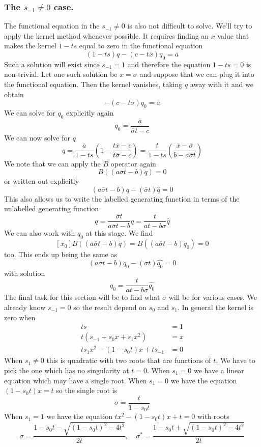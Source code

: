 \documentclass[12pt]{article}
\theoremstyle{definition} \newtheorem{definition}[theorem]{Definition}
\newcommand{\ol}[1]{\overline{#1}}
\newcommand{\wh}{\widehat}
\begin{document}
\subsubsection{The $s_{-1} \neq 0$ case.}
The functional equation in the $s_{-1} \neq 0$ is also not difficult to solve. We'll try to apply the kernel method whenever possible. It requires finding an $x$ value that makes the kernel $1 - ts$ equal to zero in the functional equation
\[
	(1-ts)q - (c -t\ol{x})q_0 = \ol{a}
\]
Such a solution will exist since $s_{-1} = 1$ and therefore the equation $1 - ts = 0$ is non-trivial. Let one such solution be $x = \sigma$ and suppose that we can plug it into the functional equation. Then the kernel vanishes, taking $q$ away with it and we obtain
\[
	- (c - t\ol{\sigma})q_0 = \ol{a}
\]
We can solve for $q_0$ explicitly again
\[
	q_0 = \frac{\ol{a}}{\ol{\sigma}t-c}
\]
We can now solve for $q$
\[
	q = \frac{\ol{a}}{1-ts}\left(1 - \frac{t\ol{x}-c}{t\ol{\sigma}-c}\right) = \frac{t}{1-ts}\left(\frac{\ol{x}-\ol{\sigma}}{b-a\ol{\sigma}t}\right)
\]
We note that we can apply the $B$ operator again
\[
	B((a\ol{\sigma}t-b)q) = 0
\]
or written out explicitly
\[
	(a\ol{\sigma}t-b)q - (\ol{\sigma}t)\wh{q} = 0
\]
This also allows us to write the labelled generating function in terms of the unlabelled generating function
\[
	q = \frac{\ol{\sigma}t}{a\ol{\sigma}t-b}\wh q =  \frac{t}{at-b\sigma}\wh q
\]
We can also work with $q_0$ at this stage. We find
\[
	[x_0]B((a\ol{\sigma}t-b)q) = B((a\ol{\sigma}t-b)q_0) = 0
\]
too. This ends up being the same as
\[
	(a\ol{\sigma}t-b)q_0 - (\ol{\sigma}t)\wh{q_0} = 0
\]
with solution
\[
	q_0 = \frac{t}{at-b\sigma}\wh{q_0}
\]
The final task for this section will be to find what $\sigma$ will be for various cases. We already know $s_{-1} = 0$ so the result depend on $s_0$ and $s_1$. In general the kernel is zero when
\begin{align*}
	t s &= 1\\
	t(s_{-1} + s_0 x + s_1 x^2) &= x\\
	ts_1 x^2 -(1-s_0t)x + ts_{-1} &= 0
\end{align*}
When $s_1 \neq 0$ this is quadratic with two roots that are functions of $t$. We have to pick the one which has no singularity at $t = 0$. When $s_1 = 0$ we have a linear equation which may have a single root.
When $s_1 = 0$ we have the equation $(1-s_0t)x = t$ so the single root is
\[
	\sigma = \frac{t}{1-s_0t}
\]
When $s_1 = 1$ we have the equation $tx^2 -(1-s_0t)x + t = 0$ with roots
\[
\sigma = \frac{1-s_0t - \sqrt{(1-s_0t)^2-4t^2}}{2t}, \quad \sigma^\ast = \frac{1-s_0t + \sqrt{(1-s_0t)^2-4t^2}}{2t}
\]
\end{document}
